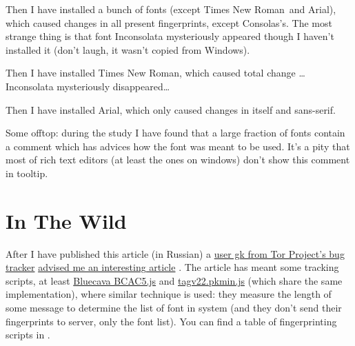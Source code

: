 \documentclass[letterpaper,14pt]{article}
\begin{document}
Then I have installed a bunch of fonts (except Times New Roman\texttrademark\ and Arial\texttrademark), which caused changes in all present fingerprints, except Consolas's\texttrademark. The most strange thing is that font Inconsolata mysteriously appeared though I haven't installed it (don't laugh, it wasn't copied from Windows\texttrademark).




Then I have installed Times New Roman\texttrademark, which caused total change \ldots{} Inconsolata mysteriously disappeared\ldots{}



Then I have installed Arial\texttrademark, which only caused changes in itself and sans-serif.



Some offtop: during the study I have found that a large fraction of fonts contain a comment which has advices how the font was meant to be used. It's a pity that most of rich text editors (at least the ones on windows) don't show this comment in tooltip.

\section{In The Wild}\label{in-the-wild}

After I have published this article (in Russian) a \href{https://trac.torproject.org/projects/tor/query?reporter=gk}{user gk from  Tor Project's bug tracker} \href{https://trac.torproject.org/projects/tor/ticket/14310\#comment:3}{advised me an interesting article} \cite{Nikiforakis2014}. The article has meant some tracking scripts, at least \href{http://ds.bluecava.com/v50/AC/BCAC5.js}{Bluecava BCAC5.js} and \href{http://tags.master-perf-tools.com/V20test/tagv22.pkmin.js}{tagv22.pkmin.js} (which share the same implementation), where similar technique is used: they measure the length of some message to determine the list of font in system (and they don't send their fingerprints to server, only the font list). You can find a table of fingerprinting scripts in \cite{Acar2013,Acar2014}.
\end{document}

